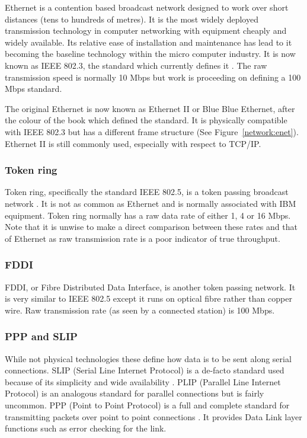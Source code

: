 Ethernet is a contention based broadcast network designed to work over
short distances (tens to hundreds of metres).  It is the most widely
deployed transmission technology in computer networking with equipment
cheaply and widely available.  Its relative ease of installation and
maintenance has lead to it becoming the baseline technology within the
micro computer industry.  It is now known as IEEE 802.3, the standard
which currently defines it \cite{Digital:Ethernet}
\cite{IEEE:Ethernet}.  The raw transmission speed is normally 10 Mbps
but work is proceeding on defining a 100 Mbps standard.

The original Ethernet is now known as Ethernet II or Blue Blue
Ethernet, after the colour of the book which defined the standard.  It
is physically compatible with IEEE 802.3 but has a different frame
structure (See Figure~\ref{network:enet}).  Ethernet II is still
commonly used, especially with respect to TCP/IP.

\subsubsection{Token ring}

Token ring, specifically the standard IEEE 802.5, is a token passing
broadcast network \cite{IEEE:Tokenring}.  It is not as common as
Ethernet and is normally associated with IBM equipment.  Token ring
normally has a raw data rate of either 1, 4 or 16 Mbps.  Note that it
is unwise to make a direct comparison between these rates and that of
Ethernet as raw transmission rate is a poor indicator of true
throughput.

\subsubsection{FDDI}

FDDI, or Fibre Distributed Data Interface, is another token passing
network.  It is very similar to IEEE 802.5 except it runs on optical
fibre rather than copper wire.  Raw transmission rate (as seen by a
connected station) is 100 Mbps.

\subsubsection{PPP and SLIP}

While not physical technologies these define how data is to be sent
along serial connections.  SLIP (Serial Line Internet Protocol) is a
de-facto standard used because of its simplicity and wide availability
\cite{RFC:1055}.  PLIP (Parallel Line Internet Protocol) is an
analogous standard for parallel connections but is fairly uncommon.
PPP (Point to Point Protocol) is a full and complete standard for
transmitting packets over point to point connections \cite{RFC:1661}.
It provides Data Link layer functions such as error checking for the
link.

